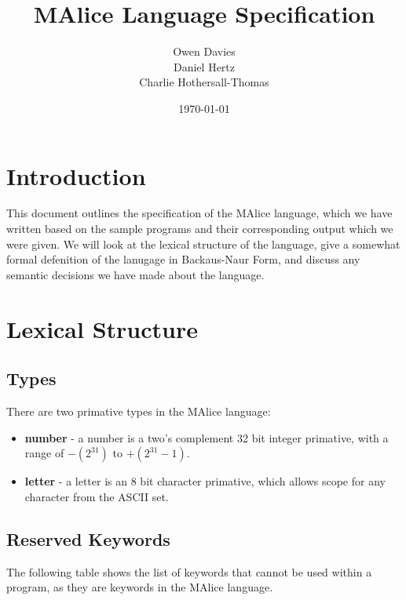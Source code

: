 \documentclass[a4, 11pt]{article}
\begin{document}
\title{\huge{MAlice Language Specification}}
\author{Owen Davies\\Daniel Hertz\\Charlie Hothersall-Thomas}
\date{\today}

\maketitle

\section*{Introduction}
This document outlines the specification of the MAlice language, which we have written based on the sample programs and their corresponding output which we were given. We will look at the lexical structure of the language, give a somewhat formal defenition of the lanugage in Backaus-Naur Form, and discuss any semantic decisions we have made about the language.

\section*{Lexical Structure}
\subsection*{Types}
There are two primative types in the MAlice language:

\begin{itemize}
  \item \textbf{number} - a number is a two's complement 32 bit integer 
  primative, with a range of \( -(2^{31}) \) to \( +(2^{31} - 1) \). 
  \item \textbf{letter} - a letter is an 8 bit character primative, which 
  allows scope for any character from the ASCII set.
\end{itemize}

\subsection*{Reserved Keywords}
The following table shows the list of keywords that cannot be used within a program, as they are keywords in the MAlice language.
\end{document}
